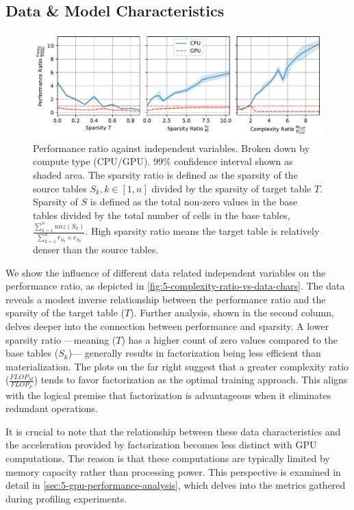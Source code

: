 \subsection{Data \& Model Characteristics}
\begin{figure}[ht]
  \centering
  \includegraphics[width=\linewidth]{chapters/05_cost_estimation/figures/motivation_perf_ratio_vs_data_chars.pdf}
  \caption[Performance ratio for various data characteristics]{Performance ratio against independent variables. Broken down by compute type (CPU/GPU). $99\%$ confidence interval shown as shaded area. The sparsity ratio is defined as the sparsity of the source tables $S_k, k\in[1,n]$ divided by the sparsity of target table $T$. Sparsity of $S$ is defined as the total non-zero values in the base tables divided by the total number of cells in the base tables, $\frac{\sum_{k=1}^{n} nnz(S_k)}{\sum_{k=1}^{n} r_{S_k} \times c_{S_k}}$. High sparsity ratio means the target table is relatively denser than the source tables.}
  \label{fig:5-complexity-ratio-vs-data-chars}
\end{figure}
We show the influence of different data related independent variables on the performance ratio, as depicted in \autoref{fig:5-complexity-ratio-vs-data-chars}. The data reveals a modest inverse relationship between the performance ratio and the sparsity of the target table ($T$). Further analysis, shown in the second column, delves deeper into the connection between performance and sparsity. A lower sparsity ratio —meaning ($T$) has a higher count of zero values compared to the base tables ($S_k$)— generally results in factorization being less efficient than materialization. The plots on the far right suggest that a greater complexity ratio ($\frac{FLOP_M}{FLOP_F}$) tends to favor factorization as the optimal training approach. This aligns with the logical premise that factorization is advantageous when it eliminates redundant operations.

It is crucial to note that the relationship between these data characteristics and the acceleration provided by factorization becomes less distinct with GPU computations. The reason is that these computations are typically limited by memory capacity rather than processing power. This perspective is examined in detail in \autoref{sec:5-gpu-performance-analysis}, which delves into the metrics gathered during profiling experiments.

